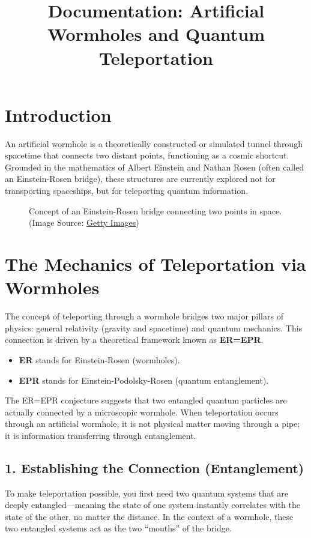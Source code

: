 \documentclass[12pt]{article}
\title{\textbf{Documentation: Artificial Wormholes and Quantum Teleportation}}
\date{}
\begin{document}
\maketitle

\section*{Introduction}
An artificial wormhole is a theoretically constructed or simulated tunnel through spacetime that connects two distant points, functioning as a cosmic shortcut. Grounded in the mathematics of Albert Einstein and Nathan Rosen (often called an Einstein-Rosen bridge), these structures are currently explored not for transporting spaceships, but for teleporting quantum information.

\begin{figure}[h]
    \centering
    \vspace{1em}
    \caption{Concept of an Einstein-Rosen bridge connecting two points in space. (Image Source: \href{https://www.gettyimages.com/detail/illustration/wormhole-illustration-royalty-free-illustration/590279765}{Getty Images})}
\end{figure}

\section*{The Mechanics of Teleportation via Wormholes}
The concept of teleporting through a wormhole bridges two major pillars of physics: general relativity (gravity and spacetime) and quantum mechanics. This connection is driven by a theoretical framework known as \textbf{ER=EPR}.

\begin{itemize}
    \item \textbf{ER} stands for Einstein-Rosen (wormholes).
    \item \textbf{EPR} stands for Einstein-Podolsky-Rosen (quantum entanglement).
\end{itemize}

The ER=EPR conjecture suggests that two entangled quantum particles are actually connected by a microscopic wormhole. When teleportation occurs through an artificial wormhole, it is not physical matter moving through a pipe; it is information transferring through entanglement.

\subsection*{1. Establishing the Connection (Entanglement)}
To make teleportation possible, you first need two quantum systems that are deeply entangled---meaning the state of one system instantly correlates with the state of the other, no matter the distance. In the context of a wormhole, these two entangled systems act as the two ``mouths'' of the bridge.
\end{document}
